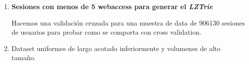 \begin{enumerate}
	
	
	
	
	\item \label{exp6}	
	\textbf{Sesiones con menos de 5 webaccess para generar el \emph{LZTrie}}
	
	
	
	Hacemos una validación cruzada para una muestra de data de 906130 sesiones de usuarios para probar como se comporta con cross validation.
	
	
	
	
	
	
	
	
	
	
	
	
	
	
	
	
	
	
	\item  Dataset uniformes de largo acotado inferiormente y volumenes de alto tamaño.


	
\end{enumerate}








 






